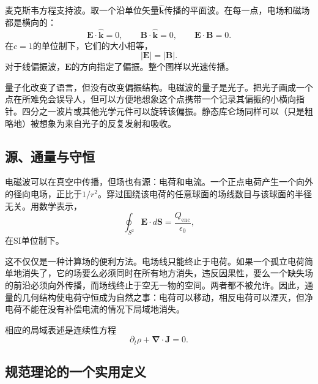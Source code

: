 麦克斯韦方程支持波。取一个沿单位矢量\(\hat{\boldsymbol k}\)传播的平面波。在每一点，电场和磁场都是横向的：
\begin{equation}
\boldsymbol E\cdot\hat{\boldsymbol k}=0,
\qquad
\boldsymbol B\cdot\hat{\boldsymbol k}=0,
\qquad
\boldsymbol E\cdot\boldsymbol B=0.
\end{equation}
在\(c=1\)的单位制下，它们的大小相等，
\begin{equation}
|\boldsymbol E|=|\boldsymbol B|.
\end{equation}
对于线偏振波，\(\boldsymbol E\)的方向指定了偏振。整个图样以光速传播。

量子化改变了语言，但没有改变偏振结构。电磁波的量子是光子。把光子画成一个点在所难免会误导人，但可以方便地想象这个点携带一个记录其偏振的小横向指针。四分之一波片或其他光学元件可以旋转该偏振。静态库仑场同样可以（只是粗略地）被想象为来自光子的反复发射和吸收。

\subsection{源、通量与守恒}

电磁波可以在真空中传播，但场也有源：电荷和电流。一个正点电荷产生一个向外的径向电场，正比于\(1/r^2\)。穿过围绕该电荷的任意球面的场线数目与该球面的半径无关。用数学表示，
\begin{equation}
\oint_{S^2}\boldsymbol E\cdot d\boldsymbol S
=\frac{Q_{\mathrm{enc}}}{\epsilon_0},
\label{eq:l5-gauss}
\end{equation}
在SI单位制下。

这不仅仅是一种计算场的便利方法。电场线只能终止于电荷。如果一个孤立电荷简单地消失了，它的场要么必须同时在所有地方消失，违反因果性，要么一个缺失场的前沿必须向外传播，而场线终止于空无一物的空间。两者都不被允许。因此，通量的几何结构使电荷守恒成为自然之事：电荷可以移动，相反电荷可以湮灭，但净电荷不能在没有补偿电流的情况下局域地消失。

相应的局域表述是连续性方程
\begin{equation}
\partial_t\rho+\boldsymbol\nabla\cdot\boldsymbol J=0.
\label{eq:l5-continuity}
\end{equation}

\subsection{规范理论的一个实用定义}

